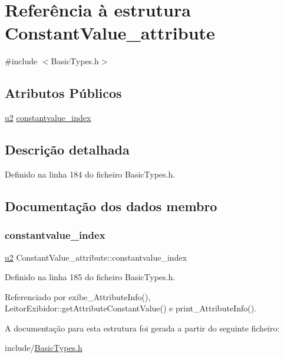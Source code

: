 \hypertarget{structConstantValue__attribute}{}\section{Referência à estrutura Constant\+Value\+\_\+attribute}
\label{structConstantValue__attribute}


{\ttfamily \#include $<$Basic\+Types.\+h$>$}

\subsection*{Atributos Públicos}
\begin{DoxyCompactItemize}
\item 
\hyperlink{BasicTypes_8h_a732cde1300aafb73b0ea6c2558a7a54f}{u2} \hyperlink{structConstantValue__attribute_a812157e7121906faf8018ce066d1ea27}{constantvalue\+\_\+index}
\end{DoxyCompactItemize}


\subsection{Descrição detalhada}


Definido na linha 184 do ficheiro Basic\+Types.\+h.



\subsection{Documentação dos dados membro}
\mbox{\label{structConstantValue__attribute_a812157e7121906faf8018ce066d1ea27}} 
\subsubsection{\texorpdfstring{constantvalue\+\_\+index}{constantvalue\_index}}
{\footnotesize\ttfamily \hyperlink{BasicTypes_8h_a732cde1300aafb73b0ea6c2558a7a54f}{u2} Constant\+Value\+\_\+attribute\+::constantvalue\+\_\+index}



Definido na linha 185 do ficheiro Basic\+Types.\+h.



Referenciado por exibe\+\_\+\+Attribute\+Info(), Leitor\+Exibidor\+::get\+Attribute\+Constant\+Value() e print\+\_\+\+Attribute\+Info().



A documentação para esta estrutura foi gerada a partir do seguinte ficheiro\+:\begin{DoxyCompactItemize}
\item 
include/\hyperlink{BasicTypes_8h}{Basic\+Types.\+h}\end{DoxyCompactItemize}
